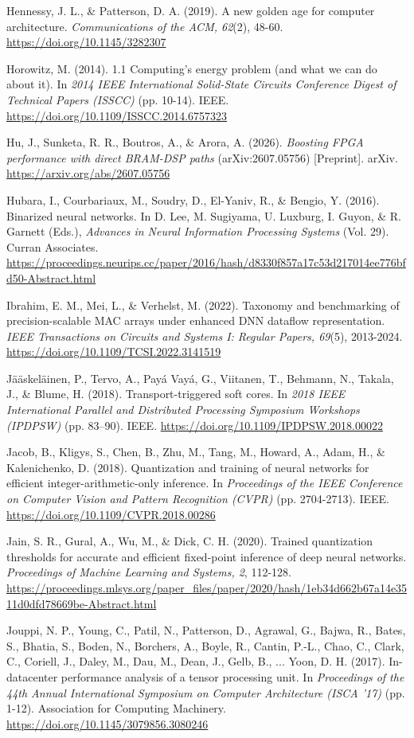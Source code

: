 \begin{apareferences}
Hennessy, J. L., \& Patterson, D. A. (2019). A new golden age for computer architecture. \emph{Communications of the ACM, 62}(2), 48-60. \url{https://doi.org/10.1145/3282307}

Horowitz, M. (2014). 1.1 Computing's energy problem (and what we can do about it). In \emph{2014 IEEE International Solid-State Circuits Conference Digest of Technical Papers (ISSCC)} (pp. 10-14). IEEE. \url{https://doi.org/10.1109/ISSCC.2014.6757323}

Hu, J., Sunketa, R. R., Boutros, A., \& Arora, A. (2026). \emph{Boosting FPGA performance with direct BRAM-DSP paths} (arXiv:2607.05756) {[}Preprint{]}. arXiv. \url{https://arxiv.org/abs/2607.05756}

Hubara, I., Courbariaux, M., Soudry, D., El-Yaniv, R., \& Bengio, Y. (2016). Binarized neural networks. In D. Lee, M. Sugiyama, U. Luxburg, I. Guyon, \& R. Garnett (Eds.), \emph{Advances in Neural Information Processing Systems} (Vol. 29). Curran Associates. \url{https://proceedings.neurips.cc/paper/2016/hash/d8330f857a17c53d217014ee776bfd50-Abstract.html}

Ibrahim, E. M., Mei, L., \& Verhelst, M. (2022). Taxonomy and benchmarking of precision-scalable MAC arrays under enhanced DNN dataflow representation. \emph{IEEE Transactions on Circuits and Systems I: Regular Papers, 69}(5), 2013-2024. \url{https://doi.org/10.1109/TCSI.2022.3141519}

Jääskeläinen, P., Tervo, A., Payá Vayá, G., Viitanen, T., Behmann, N., Takala, J., \& Blume, H. (2018). Transport-triggered soft cores. In \emph{2018 IEEE International Parallel and Distributed Processing Symposium Workshops (IPDPSW)} (pp. 83–90). IEEE. \url{https://doi.org/10.1109/IPDPSW.2018.00022}

Jacob, B., Kligys, S., Chen, B., Zhu, M., Tang, M., Howard, A., Adam, H., \& Kalenichenko, D. (2018). Quantization and training of neural networks for efficient integer-arithmetic-only inference. In \emph{Proceedings of the IEEE Conference on Computer Vision and Pattern Recognition (CVPR)} (pp. 2704-2713). IEEE. \url{https://doi.org/10.1109/CVPR.2018.00286}

Jain, S. R., Gural, A., Wu, M., \& Dick, C. H. (2020). Trained quantization thresholds for accurate and efficient fixed-point inference of deep neural networks. \emph{Proceedings of Machine Learning and Systems, 2}, 112-128. \url{https://proceedings.mlsys.org/paper_files/paper/2020/hash/1eb34d662b67a14e3511d0dfd78669be-Abstract.html}

Jouppi, N. P., Young, C., Patil, N., Patterson, D., Agrawal, G., Bajwa, R., Bates, S., Bhatia, S., Boden, N., Borchers, A., Boyle, R., Cantin, P.-L., Chao, C., Clark, C., Coriell, J., Daley, M., Dau, M., Dean, J., Gelb, B., ... Yoon, D. H. (2017). In-datacenter performance analysis of a tensor processing unit. In \emph{Proceedings of the 44th Annual International Symposium on Computer Architecture (ISCA '17)} (pp. 1-12). Association for Computing Machinery. \url{https://doi.org/10.1145/3079856.3080246}


\end{apareferences}
